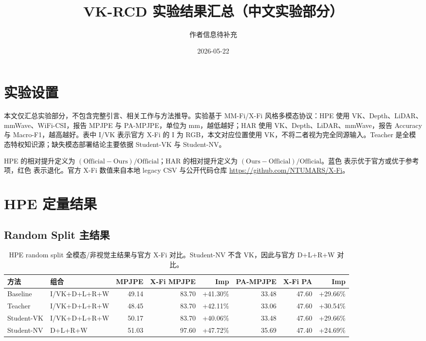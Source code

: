 \documentclass[UTF8,10pt]{ctexart}
\title{VK-RCD 实验结果汇总（中文实验部分）}
\author{作者信息待补充}
\date{2026-05-22}
\newcommand{\better}[1]{\textcolor{goodblue}{#1}}
\newcommand{\worse}[1]{\textcolor{badred}{#1}}
\begin{document}
\maketitle

\section{实验设置}
本文仅汇总实验部分，不包含完整引言、相关工作与方法推导。实验基于 MM-Fi/X-Fi 风格多模态协议：HPE 使用 VK、Depth、LiDAR、mmWave、WiFi-CSI，报告 MPJPE 与 PA-MPJPE，单位为 mm，越低越好；HAR 使用 VK、Depth、LiDAR、mmWave，报告 Accuracy 与 Macro-F1，越高越好。表中 I/VK 表示官方 X-Fi 的 I 为 RGB，本文对应位置使用 VK，不将二者视为完全同源输入。Teacher 是全模态特权知识源；缺失模态部署结论主要依据 Student-VK 与 Student-NV。

HPE 的相对提升定义为 $(\mathrm{Official}-\mathrm{Ours})/\mathrm{Official}$；HAR 的相对提升定义为 $(\mathrm{Ours}-\mathrm{Official})/\mathrm{Official}$。\better{蓝色} 表示优于官方或优于参考项，\worse{红色} 表示退化。官方 X-Fi 数值来自本地 legacy CSV 与公开代码仓库 \url{https://github.com/NTUMARS/X-Fi}。

\section{HPE 定量结果}
\subsection{Random Split 主结果}
\begin{table}[H]\centering\scriptsize
\caption{HPE random split 全模态/非视觉主结果与官方 X-Fi 对比。Student-NV 不含 VK，因此与官方 D+L+R+W 对比。}
\begin{tabular}{llrrrrrr}
\toprule
方法 & 组合 & MPJPE & X-Fi MPJPE & Imp & PA-MPJPE & X-Fi PA & Imp\\
\midrule
Baseline & I/VK+D+L+R+W & 49.14 & 83.70 & \better{+41.30\%} & 33.48 & 47.60 & \better{+29.66\%}\\
Teacher & I/VK+D+L+R+W & 48.45 & 83.70 & \better{+42.11\%} & 33.06 & 47.60 & \better{+30.54\%}\\
Student-VK & I/VK+D+L+R+W & 50.17 & 83.70 & \better{+40.06\%} & 33.48 & 47.60 & \better{+29.66\%}\\
Student-NV & D+L+R+W & 51.03 & 97.60 & \better{+47.72\%} & 35.69 & 47.40 & \better{+24.69\%}\\
\bottomrule
\end{tabular}
\end{table}
\end{document}
